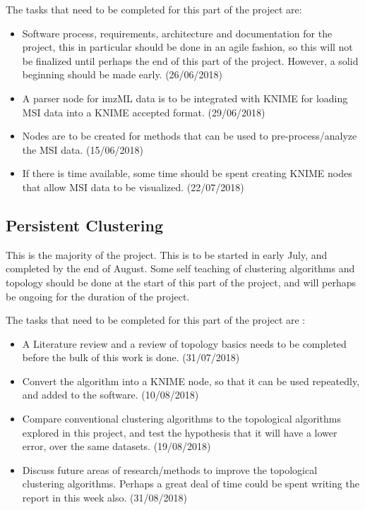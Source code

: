 \documentclass{article}
\begin{document}
The tasks that need to be completed for this part of the project are:

\begin{itemize}
	\item Software process, requirements, architecture and documentation for the project, this in particular should be done in an agile fashion, so this will not be finalized until perhaps the end of this part of the project. However, a solid beginning should be made early. (26/06/2018)
	\item A parser node for imzML data is to be integrated with KNIME for loading MSI data into a KNIME accepted format. (29/06/2018)
	\item Nodes are to be created for methods that can be used to pre-process/analyze the MSI data. (15/06/2018)
    \item If there is time available, some time should be spent creating KNIME nodes that allow MSI data to be visualized. (22/07/2018)
\end{itemize}


\subsection{Persistent Clustering}
This is the majority of the project. This is to be started in early July, and completed by the end of August. Some self teaching of clustering algorithms and topology should be done at the start of this part of the project, and will perhaps be ongoing for the duration of the project.

The tasks that need to be completed for this part of the project are :

\begin{itemize}
	\item A Literature review and a review of topology basics needs to be completed before the bulk of this work is done. (31/07/2018)
    \item Convert the algorithm into a KNIME node, so that it can be used repeatedly, and added to the software. (10/08/2018)
    \item Compare conventional clustering algorithms to the topological algorithms explored in this project, and test the hypothesis that it will have a lower error, over the same datasets. (19/08/2018)
    \item Discuss future areas of research/methods to improve the topological clustering algorithms. Perhaps a great deal of time could be spent writing the report in this week also. (31/08/2018)
\end{itemize}
\end{document}
